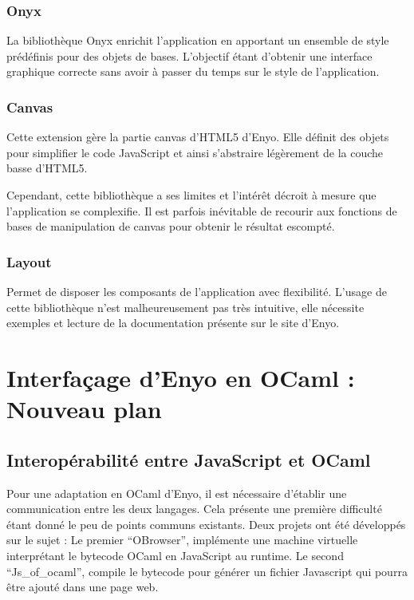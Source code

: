 \documentclass[11pt,a4paper]{report}
\begin{document}
\subsection{Onyx}

La bibliothèque Onyx enrichit l'application en apportant un ensemble de style prédéfinis pour 
des objets de bases. L'objectif étant d'obtenir une interface graphique correcte sans avoir
à passer du temps sur le style de l'application.

\subsection{Canvas}

Cette extension gère la partie canvas d'HTML5 d'Enyo. Elle définit des objets pour simplifier 
le code JavaScript et ainsi s'abstraire légèrement de la couche basse d'HTML5.

Cependant, cette bibliothèque a ses limites et l'intérêt décroit à mesure que l'application se complexifie.
Il est parfois inévitable de recourir aux fonctions de bases de manipulation de canvas pour obtenir
le résultat escompté.

\subsection{Layout}

Permet de disposer les composants de l'application avec flexibilité.
L'usage de cette bibliothèque n'est malheureusement pas très intuitive, elle nécessite 
exemples et lecture de la documentation présente sur le site d'Enyo.

\chapter{Interfaçage d'Enyo en OCaml : Nouveau plan}\label{chap:model}

\section{Interopérabilité entre JavaScript et OCaml}

Pour une adaptation en OCaml d'Enyo, il est nécessaire d'établir une communication
entre les deux langages. Cela présente une première difficulté étant donné le peu
de points communs existants. Deux projets ont été développés sur le sujet : Le premier 
``OBrowser''\cite{pwt}, implémente une machine virtuelle interprétant le bytecode OCaml
en JavaScript au runtime. Le second ``Js\_of\_ocaml'', compile le bytecode pour générer
un fichier Javascript qui pourra être ajouté dans une page web.
\end{document}
